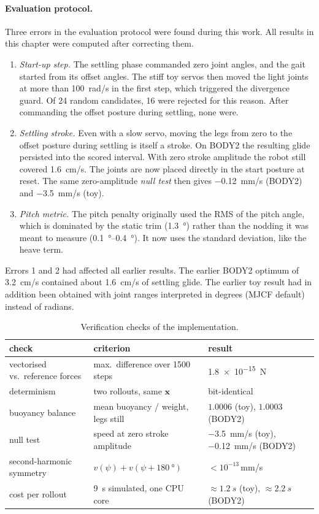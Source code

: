 \paragraph{Evaluation protocol.}
Three errors in the evaluation protocol were found during this work. All results in
this chapter were computed after correcting them.
\begin{enumerate}
  \item \emph{Start-up step.} The settling phase commanded zero joint angles, and the
    gait started from its offset angles. The stiff toy servos then moved the light
    joints at more than \SI{100}{rad/s} in the first step, which triggered the
    divergence guard. Of 24 random candidates, 16 were rejected for this reason. After
    commanding the offset posture during settling, none were.
  \item \emph{Settling stroke.} Even with a slow servo, moving the legs from zero to
    the offset posture during settling is itself a stroke. On BODY2 the resulting glide
    persisted into the scored interval. With zero stroke amplitude the robot still
    covered \SI{1.6}{cm/s}. The joints are now placed directly in the start posture at
    reset. The same zero-amplitude \emph{null test} then gives \SI{-0.12}{mm/s}
    (BODY2) and \SI{-3.5}{mm/s} (toy).
  \item \emph{Pitch metric.} The pitch penalty originally used the RMS of the pitch
    angle, which is dominated by the static trim (\SI{1.3}{\degree}) rather than the
    nodding it was meant to measure (\SIrange{0.1}{0.4}{\degree}). It now uses the
    standard deviation, like the heave term.
\end{enumerate}
Errors 1 and 2 had affected all earlier results. The earlier BODY2 optimum of
\SI{3.2}{cm/s} contained about \SI{1.6}{cm/s} of settling glide. The earlier toy result
had in addition been obtained with joint ranges interpreted in degrees (MJCF default)
instead of radians.

\begin{table}[t]
\centering
\caption{Verification checks of the implementation.}
\label{tab:mj-verify}
\small
\begin{tabularx}{\linewidth}{@{}lXl@{}}
\toprule
check & criterion & result \\
\midrule
vectorised vs.\ reference forces & max.\ difference over 1500 steps & \SI{1.8e-15}{N} \\
determinism & two rollouts, same $\bm x$ & bit-identical \\
buoyancy balance & mean buoyancy / weight, legs still & $1.0006$ (toy), $1.0003$ (BODY2) \\
null test & speed at zero stroke amplitude & \SI{-3.5}{mm/s} (toy), \SI{-0.12}{mm/s} (BODY2) \\
second-harmonic symmetry & $v(\psi)+v(\psi+\SI{180}{\degree})$ & $<10^{-13}$\,\si{mm/s} \\
cost per rollout & \SI{9}{s} simulated, one CPU core & $\approx\SI{1.2}{s}$ (toy), $\approx\SI{2.2}{s}$ (BODY2) \\
\bottomrule
\end{tabularx}
\end{table}

